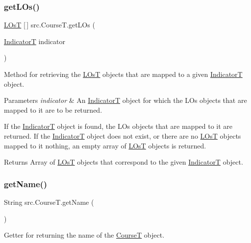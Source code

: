 \subsubsection{\texorpdfstring{get\+L\+Os()}{getLOs()}}
{\footnotesize\ttfamily \hyperlink{classsrc_1_1LOsT}{L\+OsT} \mbox{[}$\,$\mbox{]} src.\+Course\+T.\+get\+L\+Os (\begin{DoxyParamCaption}\item[{\hyperlink{enumsrc_1_1IndicatorT}{IndicatorT}}]{indicator }\end{DoxyParamCaption})}



Method for retrieving the \hyperlink{classsrc_1_1LOsT}{L\+OsT} objects that are mapped to a given \hyperlink{enumsrc_1_1IndicatorT}{IndicatorT} object. 


\begin{DoxyParams}{Parameters}
{\em indicator} & An \hyperlink{enumsrc_1_1IndicatorT}{IndicatorT} object for which the L\+Os objects that are mapped to it are to be returned.\\
\hline
\end{DoxyParams}
If the \hyperlink{enumsrc_1_1IndicatorT}{IndicatorT} object is found, the L\+Os objects that are mapped to it are returned. If the \hyperlink{enumsrc_1_1IndicatorT}{IndicatorT} object does not exist, or there are no \hyperlink{classsrc_1_1LOsT}{L\+OsT} objects mapped to it nothing, an empty array of \hyperlink{classsrc_1_1LOsT}{L\+OsT} objects is returned. \begin{DoxyReturn}{Returns}
Array of \hyperlink{classsrc_1_1LOsT}{L\+OsT} objects that correspond to the given \hyperlink{enumsrc_1_1IndicatorT}{IndicatorT} object. 
\end{DoxyReturn}
\mbox{\label{classsrc_1_1CourseT_a1cb1fbf76793e8b4f86946162acdb9a8}} 
\subsubsection{\texorpdfstring{get\+Name()}{getName()}}
{\footnotesize\ttfamily String src.\+Course\+T.\+get\+Name (\begin{DoxyParamCaption}{ }\end{DoxyParamCaption})}



Getter for returning the name of the \hyperlink{classsrc_1_1CourseT}{CourseT} object. 

